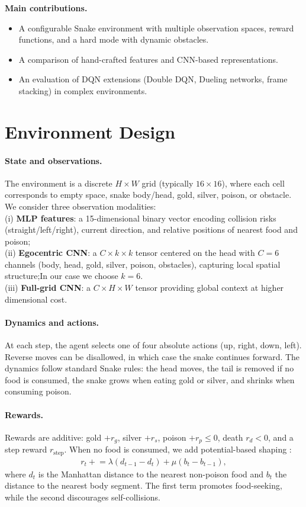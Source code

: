 \documentclass[runningheads]{llncs}
\begin{document}
\noindent\textbf{Main contributions.}
\begin{itemize}
  \item A configurable Snake environment with multiple observation spaces,
        reward functions, and a hard mode with dynamic obstacles.
  \item A comparison of hand-crafted features and CNN-based representations.
  \item An evaluation of DQN extensions (Double DQN, Dueling networks,
        frame stacking) in complex environments.
\end{itemize}
 
\section{Environment Design}
\label{sec:env}

\paragraph{State and observations.}
The environment is a discrete $H \times W$ grid (typically $16 \times 16$),
where each cell corresponds to empty space, snake body/head, gold, silver,
poison, or obstacle. We consider three observation modalities:\\
(i) \textbf{MLP features}: a 15-dimensional binary vector encoding collision
risks (straight/left/right), current direction, and relative positions of
nearest food and poison;\\
(ii) \textbf{Egocentric CNN}: a $C \times k \times k$ tensor centered on the
head with $C=6$ channels (body, head, gold, silver, poison, obstacles),
capturing local spatial structure;In our case we choose $k=6$.\\
(iii) \textbf{Full-grid CNN}: a $C \times H \times W$ tensor providing global
context at higher dimensional cost.

\paragraph{Dynamics and actions.}
At each step, the agent selects one of four absolute actions (up, right, down,
left). Reverse moves can be disallowed, in which case the snake continues
forward. The dynamics follow standard Snake rules: the head moves, the tail is
removed if no food is consumed, the snake grows when eating gold or silver,
and shrinks when consuming poison.

\paragraph{Rewards.}
Rewards are additive: gold $+r_g$, silver $+r_s$, poison $+r_p \leq 0$, death
$r_d < 0$, and a step reward $r_{\text{step}}$. When no food is consumed, we
add potential-based shaping \cite{ng1999policy}:
\begin{align}
r_t \mathrel{+}= \lambda (d_{t-1} - d_t) + \mu (b_t - b_{t-1}),
\end{align}
where $d_t$ is the Manhattan distance to the nearest non-poison food and $b_t$
the distance to the nearest body segment. The first term promotes food-seeking,
while the second discourages self-collisions.
\end{document}
